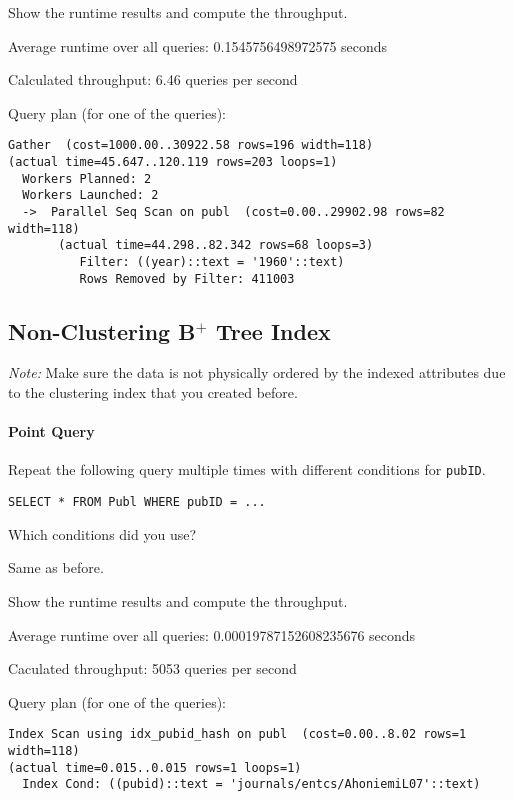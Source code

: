 \documentclass[11pt]{scrartcl}
\begin{document}
Show the runtime results and compute the throughput.

Average runtime over all queries: 0.1545756498972575 seconds

Calculated throughput: 6.46 queries per second

Query plan (for one of the queries):

{\small
\parskip0pt\begin{verbatim}
Gather  (cost=1000.00..30922.58 rows=196 width=118) 
(actual time=45.647..120.119 rows=203 loops=1)
  Workers Planned: 2
  Workers Launched: 2
  ->  Parallel Seq Scan on publ  (cost=0.00..29902.98 rows=82 width=118) 
       (actual time=44.298..82.342 rows=68 loops=3)
          Filter: ((year)::text = '1960'::text)
          Rows Removed by Filter: 411003
\end{verbatim}}

\subsection*{Non-Clustering B$^+$ Tree Index}

\emph{Note:} Make sure the data is not physically ordered by the indexed attributes due to the clustering index that you created before.

\paragraph{Point Query}

Repeat the following query multiple times with different conditions for \texttt{pubID}.

\begin{lstlisting}[style=dbtsql]
SELECT * FROM Publ WHERE pubID = ...
\end{lstlisting}

Which conditions did you use?

Same as before.

Show the runtime results and compute the throughput.

Average runtime over all queries: 0.00019787152608235676 seconds

Caculated throughput: 5053 queries per second

Query plan (for one of the queries):

{\small
\parskip0pt\begin{verbatim}
Index Scan using idx_pubid_hash on publ  (cost=0.00..8.02 rows=1 width=118) 
(actual time=0.015..0.015 rows=1 loops=1)
  Index Cond: ((pubid)::text = 'journals/entcs/AhoniemiL07'::text)
\end{verbatim}}
\end{document}
